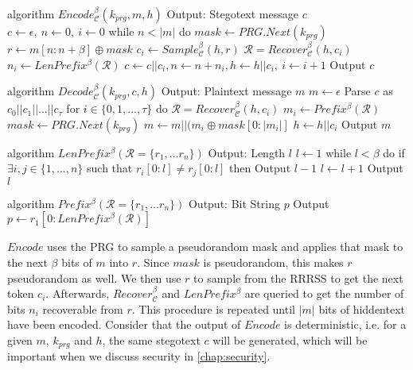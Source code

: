 \begin{Pseudocode}[caption={$Encode$ algorithm \cite{Meteor2021}}, label={alg:encode}]
algorithm $Encode_{\mathcal{C}}^\beta(k_{prg}, m, h)$
  Output: Stegotext message $c$
  $c \leftarrow \epsilon,~ n \leftarrow 0,~ i \leftarrow 0$
  while $n < |m|$ do
    $mask \leftarrow PRG.Next(k_{prg})$
    $r \leftarrow m[n:n+\beta] \oplus mask$
    $c_i \leftarrow Sample_{\mathcal{C}}^\beta(h, r)$
    $\mathcal{R} = Recover_{\mathcal{C}}^\beta(h, c_i)$
    $n_i \leftarrow LenPrefix^\beta(\mathcal{R})$
    $c \leftarrow c || c_i, n \leftarrow n+n_i, h \leftarrow h||c_i,~ i \leftarrow i + 1$
  Output $c$
\end{Pseudocode}%
\newpage
\begin{Pseudocode}[float, caption={$Decode$ algorithm \cite{Meteor2021}}, label={alg:decode}]
algorithm $Decode_{\mathcal{C}}^\beta(k_{prg}, c, h)$
  Output: Plaintext message $m$
  $m \leftarrow \epsilon$
  Parse $c$ as $c_0 || c_1 || \dots || c_{\tau}$
  for $i \in \{ 0, 1, \dots, \tau \}$ do
    $\mathcal{R} = Recover_{\mathcal{C}}^\beta(h, c_i)$
    $m_i \leftarrow Prefix^\beta(\mathcal{R})$
    $mask \leftarrow PRG.Next(k_{prg})$
    $m \leftarrow m || (m_i \oplus mask[0: |m_i|]$
    $h \leftarrow h||c_i$
  Output $m$
\end{Pseudocode}%

\begin{Pseudocode}[caption={$LenPrefix$ algorithm \cite{Meteor2021}}]
algorithm $LenPrefix^\beta(\mathcal R = \{ r_1, \dots r_n \})$
  Output: Length $l$
  $l \leftarrow 1$
  while $l < \beta$ do
    if $\exists i, j \in \{ 1, \dots, n \}$ such that $r_i[0: l] \neq r_j[0:  l]$ then
      Output $l-1$
    $l \leftarrow l+1$
  Output $l$
\end{Pseudocode}%

\begin{Pseudocode}[caption={$Prefix$ algorithm \cite{Meteor2021}}]
algorithm $Prefix^\beta(  \mathcal R = \{ r_1, \dots r_n \})$
  Output: Bit String $p$
  Output $p \leftarrow r_1[0: LenPrefix^\beta(\mathcal{R})]$
\end{Pseudocode}%

$Encode$ uses the PRG to sample a pseudorandom mask and applies that mask to the next $\beta$ bits of $m$ into $r$.
Since $mask$ is pseudorandom, this makes $r$ pseudorandom as well.
We then use $r$ to sample from the RRRSS to get the next token $c_i$.
Afterwards, $Recover_{\mathcal{C}}^\beta$ and $LenPrefix^\beta$ are queried to get the number of bits $n_i$ recoverable from $r$.
This procedure is repeated until $|m|$ bits of hiddentext have been encoded.
Consider that the output of $Encode$ is deterministic, i.e. for a given $m$, $k_{prg}$ and $h$, the same stegotext $c$ will be generated, which will be important when we discuss security in \autoref{chap:security}.

